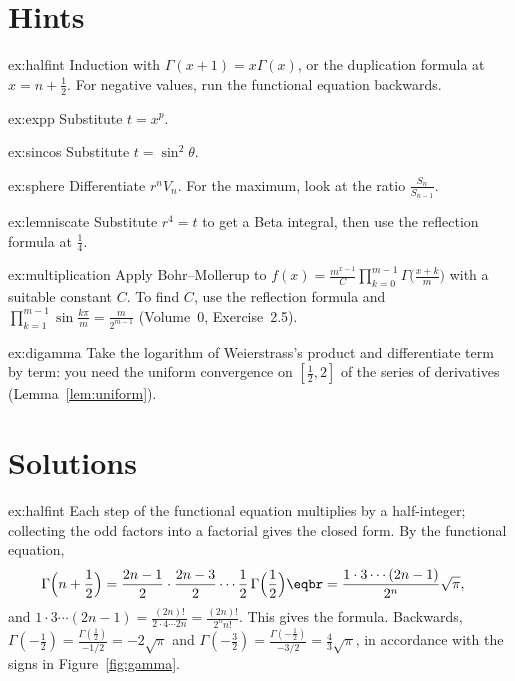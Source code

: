 \section{Hints}

\begin{hint}{ex:halfint}
Induction with $\Gamma(x+1)=x\Gamma(x)$, or the duplication formula at $x=n+\frac12$. For negative values, run the functional equation
backwards.
\end{hint}
\begin{hint}{ex:expp}
Substitute $t=x^p$.
\end{hint}
\begin{hint}{ex:sincos}
Substitute $t=\sin^2\theta$.
\end{hint}
\begin{hint}{ex:sphere}
Differentiate $r^nV_n$. For the maximum, look at the ratio $\frac{S_n}{S_{n-1}}$.
\end{hint}
\begin{hint}{ex:lemniscate}
Substitute $r^4=t$ to get a Beta integral, then use the reflection formula at $\frac14$.
\end{hint}
\begin{hint}{ex:multiplication}
Apply Bohr--Mollerup to $f(x)=\frac{m^{x-1}}C\prod_{k=0}^{m-1}\Gamma\bigl(\frac{x+k}m\bigr)$ with a suitable constant $C$. To find $C$, use
the reflection formula and $\prod_{k=1}^{m-1}\sin\frac{k\pi}m=\frac m{2^{m-1}}$ (Volume~0, Exercise~2.5).
\end{hint}
\begin{hint}{ex:digamma}
Take the logarithm of Weierstrass's product and differentiate term by term: you need the uniform convergence on $[\frac12,2]$
of the series of derivatives (Lemma~\ref{lem:uniform}).
\end{hint}

\section{Solutions}

\begin{solution}{ex:halfint}
\idea Each step of the functional equation multiplies by a half-integer; collecting the odd factors into a factorial gives
the closed form.
\writeup By the functional equation,
\[
\begin{aligned}\Gamma\Bigl(n+\frac12\Bigr)&=\frac{2n-1}2\cdot\frac{2n-3}2\cdots\frac12\,\Gamma\Bigl(\frac12\Bigr)\eqbr=\frac{1\cdot3\cdots(2n-1)}{2^n}\sqrt\pi,\end{aligned}
\]
and
$1\cdot3\cdots(2n-1)=\frac{(2n)!}{2\cdot4\cdots2n}=\frac{(2n)!}{2^nn!}$. This gives the formula. Backwards, $\Gamma(-\frac12)=\frac{\Gamma(\frac12)}{-1/2}=-2\sqrt\pi$
and $\Gamma(-\frac32)=\frac{\Gamma(-\frac12)}{-3/2}=\frac43\sqrt\pi$, in accordance with the signs in Figure~\ref{fig:gamma}.
\end{solution}

